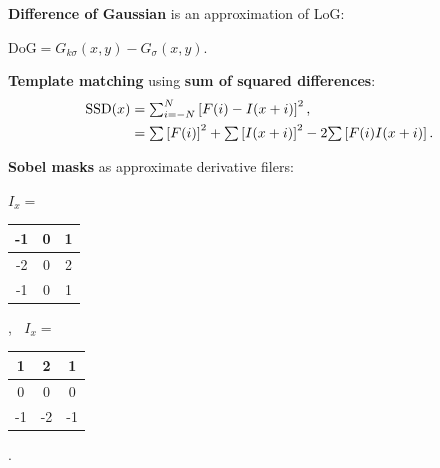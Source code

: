 \documentclass[landscape]{article}
\newcommand{\vmspace}{\vspace{-7pt}}
\newcommand{\vpspace}{\vspace{5pt}}
\begin{document}
\begin{multicols}{3}
\vpspace

\begin{minipage}{\columnwidth}
  \textbf{Difference of Gaussian} is an approximation of LoG:
  \vmspace
  \begin{center}
    $\mathrm{DoG} = G_{k\sigma}(x, y) - G_\sigma(x, y).
    $
  \end{center}
\end{minipage}

\vpspace


\begin{minipage}{\columnwidth}
  \textbf{Template matching} using \textbf{sum of squared differences}:
  \vmspace
  \vspace{-3pt}
  \begin{equation*}
    \begin{split}
      \mathrm{SSD}(x) &= \mathsmaller\sum\nolimits_{i=-N}^N \left[ F(i) - I(x+i)
      \right]^2,\\
      &= \mathsmaller\sum \left[ F(i) \right]^2 +
      \mathsmaller\sum \left[ I(x+i) \right]^2 -
      2 \mathsmaller\sum \left[ F(i) I(x+i) \right].
    \end{split}
  \end{equation*}
\end{minipage}

\vpspace

\begin{minipage}{\columnwidth}
  \textbf{Sobel masks} as approximate derivative filers:
  \vmspace
  \begin{center}
    $I_x =$
    \begin{tabular}{|c|c|c|}\hline
      -1 & 0 & 1 \\\hline
      -2 & 0 & 2 \\\hline
      -1 & 0 & 1 \\\hline
    \end{tabular} ,
    $\;\;I_x =$
    \begin{tabular}{|c|c|c|}\hline
      1 & 2 & 1 \\\hline
      0 & 0 & 0 \\\hline
      -1 & -2 & -1 \\\hline
    \end{tabular} .
  \end{center}
\end{minipage}

\vpspace


\end{multicols}
\end{document}
